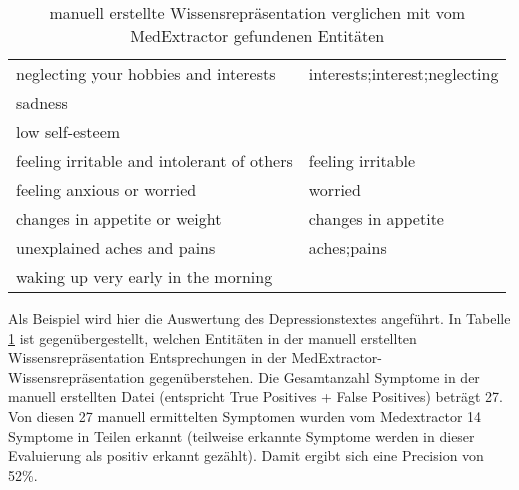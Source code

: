 \begin{table}
\begin{center}
\begin{tabular}{ll}
             neglecting your hobbies and interests & interests;interest;neglecting \\
                                           sadness &                               \\
                                   low self-esteem &                               \\
        feeling irritable and intolerant of others &             feeling irritable \\
                        feeling anxious or worried &                       worried \\
                     changes in appetite or weight &           changes in appetite \\
                       unexplained aches and pains &                   aches;pains \\
               waking up very early in the morning &                               \\
\bottomrule
\end{tabular}
\caption{manuell erstellte Wissensrepräsentation verglichen mit vom MedExtractor gefundenen Entitäten}
\label{tab:vergleich_manuell_medextractor}
\end{center}
\end{table}

Als Beispiel wird hier die Auswertung des Depressionstextes angeführt. In Tabelle \ref{tab:vergleich_manuell_medextractor} ist gegenübergestellt, welchen Entitäten in der manuell erstellten Wissensrepräsentation Entsprechungen in der MedExtractor-Wissens\-reprä\-sentation gegenüberstehen. Die Gesamtanzahl Symptome in der manuell erstellten Datei (entspricht True Positives + False Positives) beträgt 27. Von diesen 27 manuell ermittelten Symptomen wurden vom Medextractor 14 Symptome in Teilen erkannt (teilweise erkannte Symptome werden in dieser Evaluierung als positiv erkannt gezählt). Damit ergibt sich eine Precision von 52\%.



